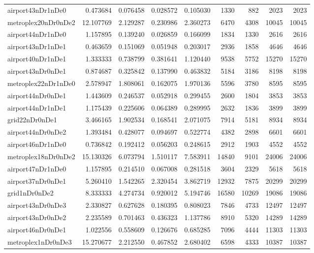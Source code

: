 \begin{longtable}{|l|r|r|r|r|r|r|r|r|}
airport43nDr1nDe0 & 0.473684 & 0.076458 & 0.028572 & 0.105030 & 1330 & 882 & 2023 & 2023 \\
metroplex20nDr0nDe2 & 12.107769 & 2.129287 & 0.230986 & 2.360273 & 6470 & 4308 & 10045 & 10045 \\
airport44nDr1nDe0 & 1.157895 & 0.139240 & 0.026859 & 0.166099 & 1834 & 1330 & 2616 & 2616 \\
airport43nDr1nDe1 & 0.463659 & 0.151069 & 0.051948 & 0.203017 & 2936 & 1858 & 4646 & 4646 \\
airport40nDr1nDe1 & 1.333333 & 0.738799 & 0.381641 & 1.120440 & 9538 & 5752 & 15270 & 15270 \\
airport43nDr0nDe1 & 0.874687 & 0.325842 & 0.137990 & 0.463832 & 5184 & 3186 & 8198 & 8198 \\
metroplex22nDr1nDe0 & 2.578947 & 1.808061 & 0.162075 & 1.970136 & 5596 & 3780 & 8595 & 8595 \\
airport44nDr0nDe1 & 1.443609 & 0.246537 & 0.052918 & 0.299455 & 2600 & 1804 & 3853 & 3853 \\
airport44nDr1nDe1 & 1.175439 & 0.225606 & 0.064389 & 0.289995 & 2632 & 1836 & 3899 & 3899 \\
grid22nDr0nDe1 & 3.466165 & 1.902534 & 0.168541 & 2.071075 & 7914 & 5181 & 8934 & 8934 \\
airport44nDr0nDe2 & 1.393484 & 0.428077 & 0.094697 & 0.522774 & 4382 & 2898 & 6601 & 6601 \\
airport46nDr1nDe0 & 0.736842 & 0.192412 & 0.056203 & 0.248615 & 2912 & 1903 & 4552 & 4552 \\
metroplex18nDr0nDe2 & 15.130326 & 6.073794 & 1.510117 & 7.583911 & 14840 & 9101 & 24006 & 24006 \\
airport47nDr1nDe0 & 1.157895 & 0.214510 & 0.067008 & 0.281518 & 3604 & 2329 & 5618 & 5618 \\
airport37nDr0nDe1 & 5.260410 & 1.542265 & 2.320454 & 3.862719 & 12932 & 7875 & 20299 & 20299 \\
grid1nDr0nDe2 & 8.333333 & 4.274734 & 0.920012 & 5.194746 & 16580 & 10269 & 19086 & 19086 \\
airport43nDr0nDe3 & 2.330827 & 0.627628 & 0.180395 & 0.808023 & 7846 & 4733 & 12497 & 12497 \\
airport43nDr0nDe2 & 2.235589 & 0.701463 & 0.436323 & 1.137786 & 8910 & 5320 & 14289 & 14289 \\
airport46nDr0nDe1 & 1.022556 & 0.558609 & 0.126676 & 0.685285 & 7096 & 4444 & 11303 & 11303 \\
metroplex1nDr0nDe3 & 15.270677 & 2.212550 & 0.467852 & 2.680402 & 6598 & 4333 & 10387 & 10387 \\

\end{longtable}
